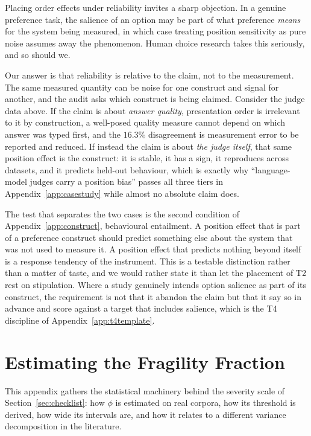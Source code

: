 \documentclass[11pt]{article}
\begin{document}
Placing order effects under reliability invites a sharp objection. In a genuine
preference task, the salience of an option may be part of what preference
\emph{means} for the system being measured, in which case treating position
sensitivity as pure noise assumes away the phenomenon. Human choice research
takes this seriously, and so should we.

Our answer is that reliability is relative to the claim, not to the
measurement. The same measured quantity can be noise for one construct and
signal for another, and the audit asks which construct is being claimed.
Consider the judge data above. If the claim is about \emph{answer quality},
presentation order is irrelevant to it by construction, a well-posed quality
measure cannot depend on which answer was typed first, and the $16.3\%$
disagreement is measurement error to be reported and reduced. If instead the
claim is about \emph{the judge itself}, that same position effect is the
construct: it is stable, it has a sign, it reproduces across datasets, and it
predicts held-out behaviour, which is exactly why ``language-model judges carry
a position bias'' passes all three tiers in Appendix~\ref{app:casestudy} while
almost no absolute claim does.

The test that separates the two cases is the second condition of
Appendix~\ref{app:construct}, behavioural entailment. A position effect that is
part of a preference construct should predict something else about the system
that was not used to measure it. A position effect that predicts nothing beyond
itself is a response tendency of the instrument. This is a testable distinction
rather than a matter of taste, and we would rather state it than let the
placement of T2 rest on stipulation. Where a study genuinely intends option
salience as part of its construct, the requirement is not that it abandon the
claim but that it say so in advance and score against a target that includes
salience, which is the T4 discipline of Appendix~\ref{app:t4template}.

\section{Estimating the Fragility Fraction}
\label{app:phistats}

This appendix gathers the statistical machinery behind the severity scale of
Section~\ref{sec:checklist}: how $\phi$ is estimated on real corpora, how its
threshold is derived, how wide its intervals are, and how it relates to a
different variance decomposition in the literature.
\end{document}
